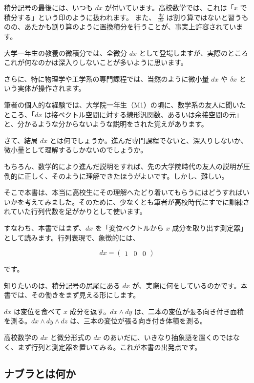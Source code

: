 \documentclass[a4paper,12pt,openany]{book}
\begin{document}
積分記号の最後には、いつも \(dx\)
が付いています。高校数学では、これは「\(x\)
で積分する」という印のように扱われます。 また、 \(\frac{dy}{dx}\)
は割り算ではないと習うものの、あたかも割り算のように置換積分を行うことが、事実上許容されています。

大学一年生の教養の微積分では、全微分 \(dx\)
として登場しますが、実際のところこれが何なのかは深入りしないことが多いように思います。

さらに、特に物理学や工学系の専門課程では、当然のように微小量 \(dx\) や
\(\delta x\) という実体が操作されます。

筆者の個人的な経験では、大学院一年生（M1）の頃に、数学系の友人に聞いたところ、「\(dx\)
は接ベクトル空間に対する線形汎関数、あるいは余接空間の元」と、分かるような分からないような説明をされた覚えがあります。

さて、結局 \(dx\)
とは何でしょうか。進んだ専門課程でないと、深入りしないか、微小量として理解するしかないのでしょうか。

もちろん、数学的により進んだ説明をすれば、先の大学院時代の友人の説明が圧倒的に正しく、そのように理解できたほうがよいです。しかし、難しい。

そこで本書は、本当に高校生にその理解へたどり着いてもらうにはどうすればいいかを考えてみました。そのために、少なくとも筆者が高校時代にすでに訓練されていた行列代数を足がかりとして使います。

すなわち、本書ではまず、\(dx\) を「変位ベクトルから \(x\)
成分を取り出す測定器」として読みます。行列表現で、象徴的には、

\[
dx=\begin{pmatrix}1&0&0\end{pmatrix}
\]

です。

知りたいのは、積分記号の尻尾にある \(dx\)
が、実際に何をしているのかです。本書では、その働きをまず見える形にします。

\(dx\) は変位を食べて \(x\) 成分を返す。\(dx\wedge dy\)
は、二本の変位が張る向き付き面積を測る。\(dx\wedge dy\wedge dz\)
は、三本の変位が張る向き付き体積を測る。

高校数学の \(dx\) と微分形式の \(dx\)
のあいだに、いきなり抽象語を置くのではなく、まず行列と測定器を置いてみる。これが本書の出発点です。

\hypertarget{ux30caux30d6ux30e9ux3068ux306fux4f55ux304b}{%
\subsection{ナブラとは何か}\label{ux30caux30d6ux30e9ux3068ux306fux4f55ux304b}}
\end{document}
